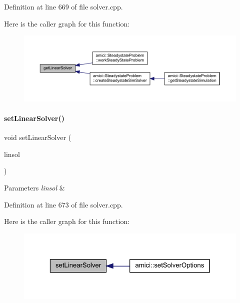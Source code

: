 Definition at line 669 of file solver.\+cpp.

Here is the caller graph for this function\+:
\nopagebreak
\begin{figure}[H]
\begin{center}
\leavevmode
\includegraphics[width=350pt]{classamici_1_1_solver_aa5cde2d316aae1d60d6eaf94ce7a854f_icgraph}
\end{center}
\end{figure}
\mbox{\label{classamici_1_1_solver_acc8ecf11ad5a8480dd02f757faa264b2}} 
\paragraph{\texorpdfstring{set\+Linear\+Solver()}{setLinearSolver()}}
{\footnotesize\ttfamily void set\+Linear\+Solver (\begin{DoxyParamCaption}\item[{\mbox{\hyperlink{namespaceamici_a1a6a4776314a0843143e5631c3ce21a7}{Linear\+Solver}}}]{linsol }\end{DoxyParamCaption})}


\begin{DoxyParams}{Parameters}
{\em linsol} & \\
\hline
\end{DoxyParams}


Definition at line 673 of file solver.\+cpp.

Here is the caller graph for this function\+:
\nopagebreak
\begin{figure}[H]
\begin{center}
\leavevmode
\includegraphics[width=323pt]{classamici_1_1_solver_acc8ecf11ad5a8480dd02f757faa264b2_icgraph}
\end{center}
\end{figure}
\mbox{\label{classamici_1_1_solver_a256c45c84346e83402b665493e04e65e}} 
